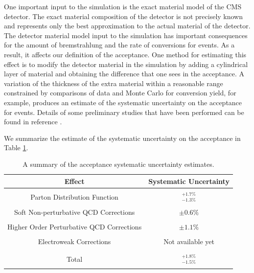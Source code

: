 \documentclass{cmspaper}
\begin{document}
One important input to the simulation is the exact material model of the CMS detector. The exact material composition of the detector is not precisely known and represents only the best approximation to the actual material of the detector. The detector material model input to the simulation has important consequences for the amount of bremstrahlung and the rate of conversions for \Z\To\Ep\Em events. As a result, it affects our definition of the acceptance. One method for estimating this effect is to modify the detector material in the simulation by adding a cylindrical layer of material and obtaining the difference that one sees in the acceptance. A variation of the thickness of the extra material within a reasonable range constrained by comparisons of data and Monte Carlo for conversion yield, for example, produces an estimate of the systematic uncertainty on the acceptance for \Z\To\Ep\Em events. Details of some preliminary studies that have been performed can be found in reference \cite{MaterialModelSystematics}.


We summarize the estimate of the systematic uncertainty on the acceptance in Table \ref{tab:AcceptanceSystematics}. 

\begin{table}[!ht]
\begin{center}
\begin{tabular}{|c|c|}
\hline
Effect & Systematic Uncertainty \\
\hline 
 & \\[1pt]
 Parton Distribution Function               & $^{+1.7 \%}_{-1.3 \%}$ \\
 & \\[1pt]
 Soft Non-perturbative QCD Corrections      & $\pm 0.6 \%$ \\
 & \\[1pt]
 Higher Order Perturbative QCD Corrections  & $\pm 1.1 \%$ \\
 & \\[1pt]
 Electroweak Corrections                    & Not available  yet  \\
 & \\[1pt]
\hline
 & \\[1pt]
 Total                                      & $^{+1.8 \%}_{-1.5 \%}$ \\
 & \\[1pt]
\hline

\end{tabular}
\caption{A summary of the acceptance systematic uncertainty estimates. \label{tab:AcceptanceSystematics}}
\end{center}
\end{table}
\end{document}
